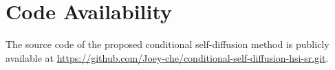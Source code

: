 \section*{Code Availability}
The source code of the proposed conditional self-diffusion method is publicly
available at \url{https://github.com/Joey-che/conditional-self-diffusion-hsi-sr.git}.
